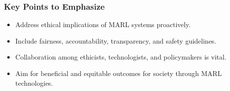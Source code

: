 \documentclass[aspectratio=169]{beamer}
\begin{document}
\begin{frame}[fragile]
  \frametitle{Key Points to Emphasize}
  \begin{itemize}
    \item Address ethical implications of MARL systems proactively.
    \item Include fairness, accountability, transparency, and safety guidelines.
    \item Collaboration among ethicists, technologists, and policymakers is vital.
    \item Aim for beneficial and equitable outcomes for society through MARL technologies.
  \end{itemize}
\end{frame}
\end{document}
